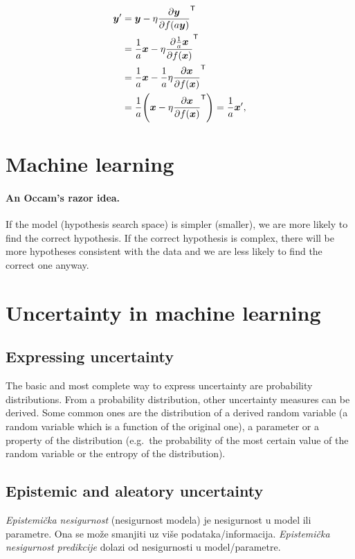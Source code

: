 \documentclass[twocolumn]{article}
\begin{document}
\begin{align}
    \vec y' 
    &= \vec y - \eta\pd{\vec y}{f(a\vec y)} ^\tp \\
    &= \frac{1}{a}\vec x -\eta\pd{\frac{1}{a}\vec x}{f(\vec x)}^\tp \\
    &= \frac{1}{a}\vec x -\frac{1}{a}\eta\pd{\vec x}{f(\vec x)}^\tp \\
    &= \frac{1}{a}\del{\vec x -\eta\pd{\vec x}{f(\vec x)}^\tp} = \frac{1}{a}\vec x' \text{,}
\end{align}

\section{Machine learning}

\paragraph{An Occam's razor idea.} If the model (hypothesis search space) is simpler (smaller), we are more likely to find the correct hypothesis. If the correct hypothesis is complex, there will be more hypotheses consistent with the data and we are less likely to find the correct one anyway.


\section{Uncertainty in machine learning}

\subsection{Expressing uncertainty}

The basic and most complete way to express uncertainty are probability distributions. From a probability distribution, other uncertainty measures can be derived. Some common ones are the distribution of a derived random variable (a random variable which is a function of the original one), a parameter or a property of the distribution (e.g.\ the probability of the most certain value of the random variable or the entropy of the distribution).


\subsection{Epistemic and aleatory uncertainty}

\emph{Epistemička nesigurnost} (nesigurnost modela) je nesigurnost u model ili parametre. Ona se može smanjiti uz više podataka/informacija. \emph{Epistemička nesigurnost predikcije} dolazi od nesigurnosti u model/parametre.
\end{document}
